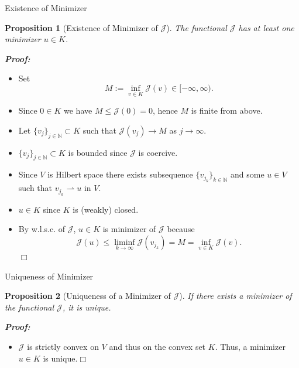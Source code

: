 \documentclass[10pt,aspectratio=169]{beamer}
\newtheorem{proposition}{Proposition}[section]
\def\N{{\mathbb N}}
\def\cJ{{\mathcal J}}
\def\eop{\hfill{$\Box$}}
\begin{document}
\begin{frame}{Existence of Minimizer}
	\begin{proposition}[Existence of Minimizer of $\cJ$]
		The functional $\cJ$ has at least one minimizer $u\in K$.
	\end{proposition}
	\textbf{\em Proof:}
	\begin{itemize}
		\item Set
		      \begin{equation*}
			      M := \inf_{v\in K}\cJ(v)\in[-\infty,\infty).
		      \end{equation*}
		\item Since $0\in K$ we have $M\le \cJ(0)=0$, hence $M$ is finite from above.
		\item Let $\{v_j\}_{j\in\N}\subset K$ such that $\cJ(v_j)\to M$ as $j\to\infty$.
		\item $\{v_j\}_{j\in\N}\subset K$ is bounded since $\cJ$ is coercive.
		\item Since $V$ is Hilbert space there exists subsequence $\{v_{j_k}\}_{k\in\N}$ and some $u\in V$ such that $v_{j_k} \rightharpoonup u$ in $V$.
		\item $u\in K$ since $K$ is (weakly) closed.
		\item By w.l.s.c. of $\cJ$, $u\in K$ is minimizer of $\cJ$ because
		      \begin{equation*}
			      \cJ(u)\le \liminf_{k\to\infty}\cJ(v_{j_k})=M=\inf_{v\in K}\cJ(v).
		      \end{equation*}\eop
	\end{itemize}
\end{frame}

\begin{frame}{Uniqueness of Minimizer}
	\begin{proposition}[Uniqueness of a Minimizer of $\cJ$]
		If there exists a minimizer of the functional $\cJ$, it is unique.
	\end{proposition}
	\textbf{\em Proof: }
	\begin{itemize}
		\item $\cJ$ is strictly convex on $V$ and thus on the convex set $K$. Thus, a minimizer $u\in K$ is unique.\eop
	\end{itemize}
\end{frame}
\end{document}
